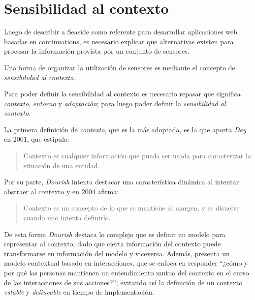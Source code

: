
\chapter{Sensibilidad al contexto}
\label{Capitulo 3}

Luego de describir a Seaside como referente para desarrollar aplicaciones web basadas en continuations, es necesario explicar que alternativas existen para procesar la información provista por un conjunto de sensores.

Una forma de organizar la utilización de sensores es mediante el concepto de \emph{sensibilidad al contexto}.

Para poder definir la sensibilidad al contexto es necesario repasar que significa \emph{contexto}, \emph{entorno} y \emph{adaptación}; para luego poder definir la \emph{sensibilidad al contexto}.


La primera definición de \emph{contexto}, que es la más adoptada, es la que aporta \emph{Dey} en 2001, que estipula:

\begin{quote}
Contexto es cualquier información que pueda ser usada para caracterizar la situación de una entidad.\cite[p.~3]{Dey01}
\end{quote}

Por su parte, \emph{Dourish} intenta destacar una característica dinámica al intentar abstraer al contexto y en 2004 afirma:

\begin{quote}
Contexto es un concepto de lo que se mantiene al margen, y se disuelve cuando uno intenta definirlo.\cite{Dourish04}
\end{quote}

De esta forma \emph{Dourish} destaca lo complejo que es definir un modelo para representar al contexto, dado que cierta información del contexto puede transformarse en información del modelo y viceversa. Además, presenta un modelo contextual basado en interacciones, que se enfoca en responder ``¿cómo y por qué las personas mantienen un entendimiento mutuo del contexto en el curso de las interacciones de sus acciones?''; evitando así la definición de un contexto \emph{estable} y \emph{delineable} en tiempo de implementación\cite[p.~5]{Dourish04}.

